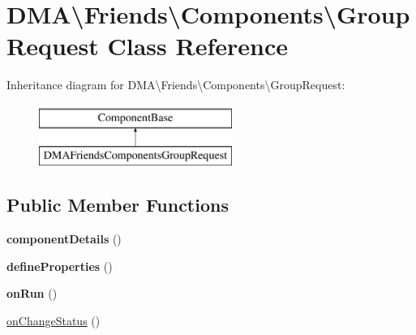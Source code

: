 \hypertarget{classDMA_1_1Friends_1_1Components_1_1GroupRequest}{\section{D\-M\-A\textbackslash{}Friends\textbackslash{}Components\textbackslash{}Group\-Request Class Reference}
\label{classDMA_1_1Friends_1_1Components_1_1GroupRequest}
}
Inheritance diagram for D\-M\-A\textbackslash{}Friends\textbackslash{}Components\textbackslash{}Group\-Request\-:\begin{figure}[H]
\begin{center}
\leavevmode
\includegraphics[height=2.000000cm]{d1/d29/classDMA_1_1Friends_1_1Components_1_1GroupRequest}
\end{center}
\end{figure}
\subsection*{Public Member Functions}
\begin{DoxyCompactItemize}
\item 
\hypertarget{classDMA_1_1Friends_1_1Components_1_1GroupRequest_afb7e37d55f101ec2dfea2af57f09b88d}{{\bfseries component\-Details} ()}\label{classDMA_1_1Friends_1_1Components_1_1GroupRequest_afb7e37d55f101ec2dfea2af57f09b88d}

\item 
\hypertarget{classDMA_1_1Friends_1_1Components_1_1GroupRequest_aa4deec2b8fa31ca4580b1eaf4ff40a4c}{{\bfseries define\-Properties} ()}\label{classDMA_1_1Friends_1_1Components_1_1GroupRequest_aa4deec2b8fa31ca4580b1eaf4ff40a4c}

\item 
\hypertarget{classDMA_1_1Friends_1_1Components_1_1GroupRequest_a78685da9fdb569d6a5a9e30304bb0d22}{{\bfseries on\-Run} ()}\label{classDMA_1_1Friends_1_1Components_1_1GroupRequest_a78685da9fdb569d6a5a9e30304bb0d22}

\item 
\hyperlink{classDMA_1_1Friends_1_1Components_1_1GroupRequest_a809f2ed08437eb0458240725f07d098c}{on\-Change\-Status} ()
\end{DoxyCompactItemize}
